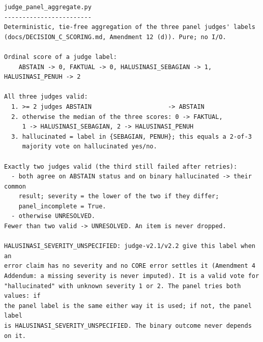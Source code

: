 \begin{lstlisting}[caption={Dokumentasi agregasi panel (\texttt{judge\_panel\_aggregate.py}).}, label={lst:panel-doc}, frame=single, captionpos=t, language={}, basicstyle=\ttfamily\scriptsize, breaklines=true, breakatwhitespace=false, columns=fullflexible, keepspaces=true]
judge_panel_aggregate.py
------------------------
Deterministic, tie-free aggregation of the three panel judges' labels
(docs/DECISION_C_SCORING.md, Amendment 12 (d)). Pure; no I/O.

Ordinal score of a judge label:
    ABSTAIN -> 0, FAKTUAL -> 0, HALUSINASI_SEBAGIAN -> 1, HALUSINASI_PENUH -> 2

All three judges valid:
  1. >= 2 judges ABSTAIN                     -> ABSTAIN
  2. otherwise the median of the three scores: 0 -> FAKTUAL,
     1 -> HALUSINASI_SEBAGIAN, 2 -> HALUSINASI_PENUH
  3. hallucinated = label in {SEBAGIAN, PENUH}; this equals a 2-of-3
     majority vote on hallucinated yes/no.

Exactly two judges valid (the third still failed after retries):
  - both agree on ABSTAIN status and on binary hallucinated -> their common
    result; severity = the lower of the two if they differ;
    panel_incomplete = True.
  - otherwise UNRESOLVED.
Fewer than two valid -> UNRESOLVED. An item is never dropped.

HALUSINASI_SEVERITY_UNSPECIFIED: judge-v2.1/v2.2 give this label when an
error claim has no severity and no CORE error settles it (Amendment 4
Addendum: a missing severity is never imputed). It is a valid vote for
"hallucinated" with unknown severity 1 or 2. The panel tries both values: if
the panel label is the same either way it is used; if not, the panel label
is HALUSINASI_SEVERITY_UNSPECIFIED. The binary outcome never depends on it.
\end{lstlisting}

